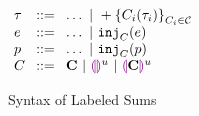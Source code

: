 
\begin{figure}[ht]
  $\arraycolsep=4pt\begin{array}{lll}
      \tau & ::= & \ldots ~\vert~ \tlabeledsum{C_i(\tau_i)}_{C_i \in \C} \\
      e    & ::= & \ldots ~\vert~ \hinj{C}{e}                            \\
      p    & ::= & \ldots ~\vert~ \hinj{C}{p}                            \\
      C    & ::= & \tagC ~\vert~ \tagehole{u} ~\vert~ \taghole{\tagC}{u}
    \end{array}$
  \caption{Syntax of Labeled Sums}
  \label{fig:labeled-sums-syntax}
\end{figure}
